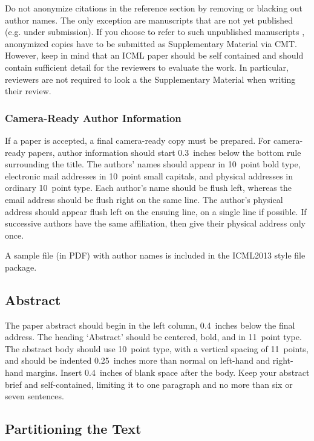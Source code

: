 \documentclass{article}
\begin{document}
Do not anonymize citations in the reference section by removing or
blacking out author names. The only exception are manuscripts that are
not yet published (e.g. under submission). If you choose to refer to
such unpublished manuscripts \cite{anonymous}, anonymized copies have 
to be submitted
as Supplementary Material via CMT. However, keep in mind that an ICML
paper should be self contained and should contain sufficient detail
for the reviewers to evaluate the work. In particular, reviewers are
not required to look a the Supplementary Material when writing their
review.

\subsubsection{Camera-Ready Author Information}
\label{final author}

If a paper is accepted, a final camera-ready copy must be prepared.
%
For camera-ready papers, author information should start 0.3~inches
below the bottom rule surrounding the title. The authors' names should
appear in 10~point bold type, electronic mail addresses in 10~point
small capitals, and physical addresses in ordinary 10~point type.
Each author's name should be flush left, whereas the email address
should be flush right on the same line. The author's physical address
should appear flush left on the ensuing line, on a single line if
possible. If successive authors have the same affiliation, then give
their physical address only once.

A sample file (in PDF) with author names is included in the ICML2013 
style file package.

\subsection{Abstract}

The paper abstract should begin in the left column, 0.4~inches below
the final address. The heading `Abstract' should be centered, bold,
and in 11~point type. The abstract body should use 10~point type, with
a vertical spacing of 11~points, and should be indented 0.25~inches
more than normal on left-hand and right-hand margins. Insert
0.4~inches of blank space after the body. Keep your abstract brief and 
self-contained,
limiting it to one paragraph and no more than six or seven sentences.

\subsection{Partitioning the Text} 
\end{document}
